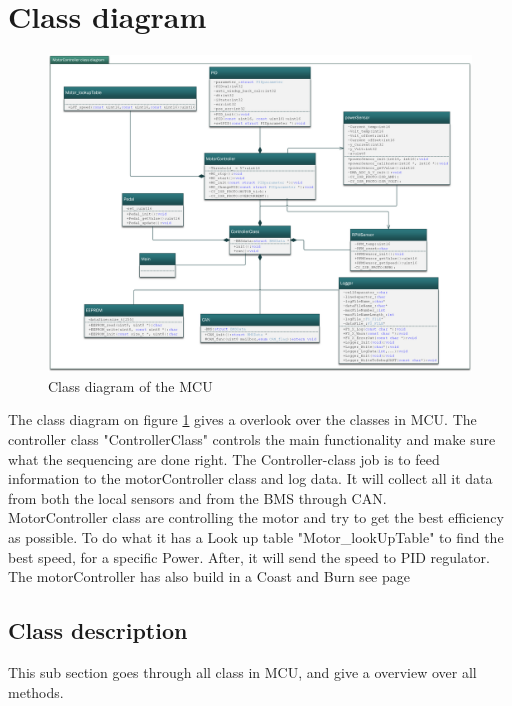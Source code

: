 \newpage
\section{Class diagram}
\label{sec:class_diagram}

\begin{figure}[H]
	\centering
	\includegraphics [width=6in]{Software/Pictures/class-diagram.png}
	\caption{Class diagram of the MCU}
	\label{fig:Class_diagram_MCU}
\end{figure}

The class diagram on figure \ref{fig:Class_diagram_MCU} gives a overlook over the classes in MCU. The controller class "ControllerClass" controls the main functionality and make sure what the sequencing are done right. The Controller-class job is to feed information to the motorController class and log data. It will collect all it data from both the local sensors and from the BMS through CAN.\\
MotorController class are controlling the motor and try to get the best efficiency as possible. To do what it has a Look up table "Motor\_lookUpTable" to find the best speed, for a specific Power. After, it will send the speed to PID regulator. The motorController has also build in a Coast and Burn see page \pageref{sec:Coast_and_Burn}\\

\subsection{Class description}

This sub section goes through all class in MCU, and give a overview over all methods.

